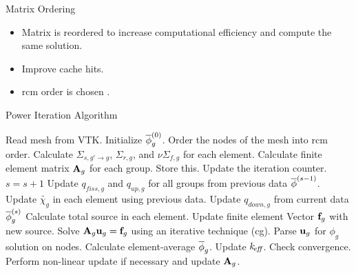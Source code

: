 \begin{frame}{Matrix Ordering}
  \begin{itemize}
    \item Matrix is reordered to increase computational efficiency and compute
      the same solution.
    \item Improve cache hits.
    \item \gls{rcm} order is chosen \cite{rcm}.
  \end{itemize}
  \vspace{-0.25in}
  \begin{figure}
    \centering
    \hspace{0.1in}
    \label{fig:sparsity_pattern}
  \end{figure}
\end{frame}

\begin{frame}{Power Iteration Algorithm}

    \begin{algorithm}[H]
      \caption{\scriptsize General Iteration Scheme}
      \label{algorithm:general}
      \begin{algorithmic}[1]
      \State Read mesh from VTK.
      \State Initialize $\overline{\phi}_g^{(0)}$.
      \State Order the nodes of the mesh into \gls{rcm} order.
        \label{state:rcm}
      \State Calculate $\Sigma_{s,g'\rightarrow g}$, $\Sigma_{r,g}$, and 
        $\nu \Sigma_{f,g}$ for each element.
      \State Calculate finite element matrix $\mathbf{A}_g$ for each group. Store this. 
        \label{state:fem_matrix}
        \State Update the iteration counter. $s=s+1$
        \State Update $q_{fiss,g}$ and $q_{up,g}$ for all groups from previous 
          data $\overline{\phi}^{(s-1)}$.
        \State Update $\widetilde{\chi_g}$ in each element using previous data.
          \label{state:chi_collapse}
          \State Update $q_{down,g}$ from current data $\overline{\phi}_g^{(s)}$
          \State Calculate total source in each element.
          \State Update finite element Vector $\mathbf{f}_g$ with new source.
            \label{state:fem_vector}
          \State Solve $\mathbf{A}_g \mathbf{u}_g = \mathbf{f}_g$ using an iterative technique
            (\gls{cg}).
          \State Parse $\mathbf{u}_g$ for $\phi_g$ solution on nodes.
          \State Calculate element-average $\overline{\phi}_g$.
        \EndFor
        \State Update $k_{\!\mbox{\scriptsize \em eff}}$.
        \State Check convergence.
        \State Perform non-linear update if necessary and update $\mathbf{A}_g$. 
          \label{state:nonlinear}
      \EndWhile
      \end{algorithmic}
    \end{algorithm}

\end{frame}

